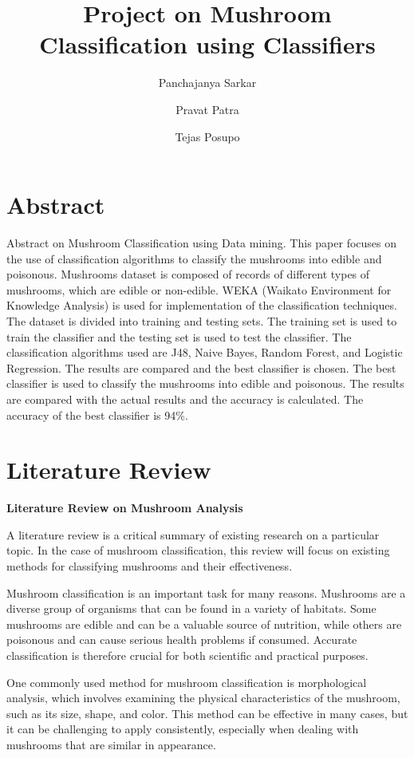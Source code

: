 \documentclass[a4paper,11pt]{article}
\title{Project on Mushroom Classification using Classifiers}
\author[a]{Panchajanya Sarkar}
\author[b]{Pravat Patra}
\author[c]{Tejas Posupo}
\affiliation[*]{Central University of Rajasthan,\\
  NH-8, Ajmer, 305817, India}
\begin{document}
    \maketitle
        \section{Abstract}
            Abstract on Mushroom Classification using Data mining.
            This paper focuses on the use of classification algorithms to classify the mushrooms into edible and poisonous. Mushrooms dataset is composed of records of different types of mushrooms, which are edible or non-edible. WEKA (Waikato Environment for Knowledge Analysis) is used for implementation of the classification techniques. The dataset is divided into training and testing sets. The training set is used to train the classifier and the testing set is used to test the classifier. The classification algorithms used are J48, Naive Bayes, Random Forest, and Logistic Regression. The results are compared and the best classifier is chosen. The best classifier is used to classify the mushrooms into edible and poisonous. The results are compared with the actual results and the accuracy is calculated. The accuracy of the best classifier is 94\%.
        \section{Literature Review}
            \textbf{Literature Review on Mushroom Analysis}

            A literature review is a critical summary of existing research on a particular topic. In the case of mushroom classification, this review will focus on existing methods for classifying mushrooms and their effectiveness.

            Mushroom classification is an important task for many reasons. Mushrooms are a diverse group of organisms that can be found in a variety of habitats. Some mushrooms are edible and can be a valuable source of nutrition, while others are poisonous and can cause serious health problems if consumed. Accurate classification is therefore crucial for both scientific and practical purposes.

            One commonly used method for mushroom classification is morphological analysis, which involves examining the physical characteristics of the mushroom, such as its size, shape, and color. This method can be effective in many cases, but it can be challenging to apply consistently, especially when dealing with mushrooms that are similar in appearance.
\end{document}
